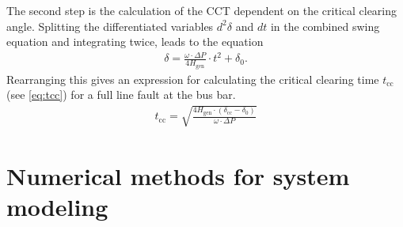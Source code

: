 The second step is the calculation of the \acs{CCT} dependent on the critical clearing angle. Splitting the differentiated variables $d^2\delta$ and $dt$ in the combined swing equation and integrating twice, leads to the equation
\begin{align}
        \delta=\frac{\omega \cdot \Delta P}{4 H_\mathrm{gen}} \cdot t^2 + \delta_\mathrm{0}. \nonumber
\end{align}
Rearranging this gives an expression for calculating the critical clearing time $t_\mathrm{cc}$ (see \autoref{eq:tcc}) for a full line fault at the bus bar.
\begin{align}
        t_\mathrm{cc}=\sqrt{\frac{4 H_\mathrm{gen} \cdot (\delta_\mathrm{cc}-\delta_\mathrm{0})}{\omega \cdot \Delta P}} \label{eq:tcc}
\end{align}

\section{Numerical methods for system modeling}
\label{sec:numerical-methods}

